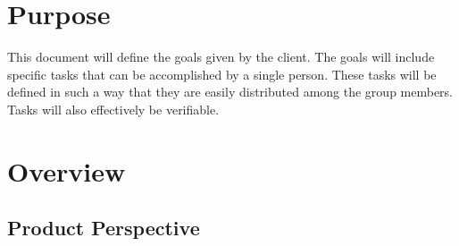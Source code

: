 \documentclass[10pt,journal,compsoc, draftclsnofoot,onecolumn]{IEEEtran}
\begin{document}
\section{Purpose}
This document will define the goals given by the client.
The goals will include specific tasks that can be accomplished by a single person.
These tasks will be defined in such a way that they are easily distributed among the group members.
Tasks will also effectively be verifiable.




\section{Overview}

\subsection{Product Perspective}
\end{document}
